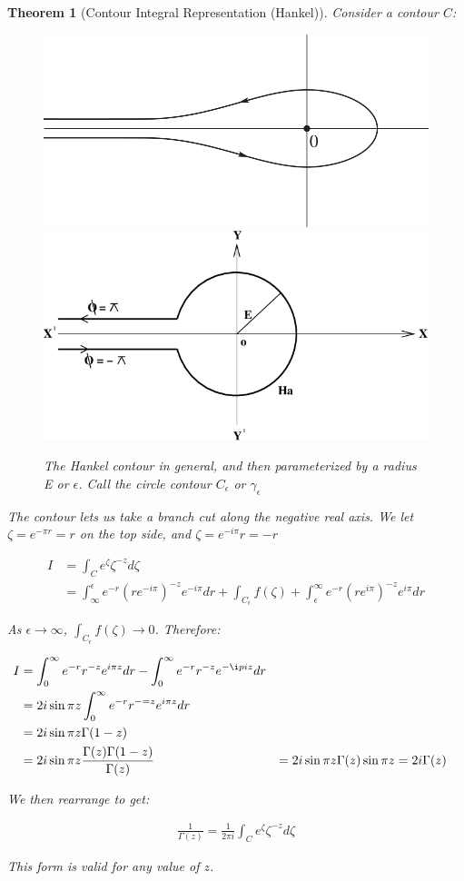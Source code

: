 \documentclass{article}
\newtheorem{theorem}{Theorem}[section]
\theoremstyle{definition}
\begin{document}
\begin{theorem}[Contour Integral Representation (Hankel)]
Consider a contour $C$:
\begin{figure}[H]
	\centering
	\includegraphics[width=0.7\linewidth]{hankel_contour}
	\includegraphics[width=0.7\linewidth]{hankel2}
	\caption{The Hankel contour in general, and then parameterized by a radius E or $\epsilon$. Call the circle contour $C_\epsilon$ or $\gamma_\epsilon$}
	\label{fig:hankelcontour}
\end{figure}



The contour lets us take a branch cut along the negative real axis. We let $\zeta = e^{-\pi r} = r$ on the top side, and $\zeta = e^{-i\pi}r = -r$


\begin{align*}
I &= \int_{C} e^{\zeta} \zeta^{-z} d\zeta \\ 
&= \int_{\infty}^{\epsilon} e^{-r} (re^{-i\pi})^{-z} e^{-i\pi}dr + \int_{C_\epsilon} f(\zeta) + \int_{\epsilon}^{\infty} e^{-r} (re^{i\pi})^{-z} e^{i\pi}dr
\end{align*}

As $\epsilon \to \infty$, $\int_{C_\epsilon} f(\zeta) \to 0$. Therefore:

\begin{align*}
I &= \int_{0}^{\infty} e^{-r} r^{-z} e^{i\pi z}dr  - \int_{0}^{\infty} e^{-r} r^{-z} e^{-\i pi z} dr \\ 
&= 2 i \sin \pi z  \int_{0}^{\infty} e^{-r} r^{-= z} e^{i\pi z}dr \\ 
&=  2 i \sin \pi z \Gamma(1-z) \\ 
&=  2 i \sin \pi z \frac{\Gamma(z)\Gamma(1-z)}{\Gamma(z)}
&= { 2 i \sin \pi z }{\Gamma(z) \sin \pi z}
&= { 2 i }{\Gamma(z) } \\ 
\end{align*}

We then rearrange to get:

\begin{align*}
\frac{1}{\Gamma(z)} = \frac{1}{2\pi i } \int_{C} e^\zeta \zeta ^{-z} d\zeta 
\end{align*}

This form is valid for any value of $z$.
\end{theorem}
\end{document}
